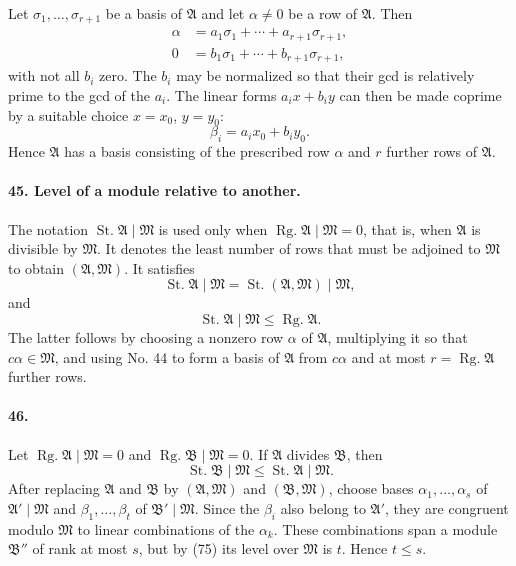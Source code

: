 \documentclass[11pt]{article}
\newcommand{\Rg}{\operatorname{Rg.}}
\newcommand{\St}{\operatorname{St.}}
\begin{document}
Let $\sigma_1,
\ldots,
\sigma_{r+1}$ be a basis of $\mathfrak A$ and let $\alpha\ne0$ be a row of $\mathfrak A$. Then
\begin{align}
\alpha&=a_1\sigma_1+
\cdots+a_{r+1}\sigma_{r+1},
\tag{71}\\
0&=b_1\sigma_1+
\cdots+b_{r+1}\sigma_{r+1},
\tag{72}
\end{align}
with not all $b_i$ zero. The $b_i$ may be normalized so that their gcd is relatively prime to the gcd of the $a_i$. The linear forms $a_ix+b_iy$ can then be made coprime by a suitable choice $x=x_0$, $y=y_0$:
\begin{equation}
\beta_i=a_ix_0+b_iy_0.
\tag{73}
\end{equation}
Hence $\mathfrak A$ has a basis consisting of the prescribed row $\alpha$ and $r$ further rows of $\mathfrak A$.

\paragraph{45. Level of a module relative to another.}
The notation $\St\mathfrak A\mid\mathfrak M$ is used only when $\Rg\mathfrak A\mid\mathfrak M=0$, that is, when $\mathfrak A$ is divisible by $\mathfrak M$. It denotes the least number of rows that must be adjoined to $\mathfrak M$ to obtain $(\mathfrak A,
\mathfrak M)$. It satisfies
\begin{equation}
\St\mathfrak A\mid\mathfrak M=\St(\mathfrak A,
\mathfrak M)\mid\mathfrak M,
\tag{74}
\end{equation}
and
\begin{equation}
\St\mathfrak A\mid\mathfrak M\le \Rg\mathfrak A.
\tag{75}
\end{equation}
The latter follows by choosing a nonzero row $\alpha$ of $\mathfrak A$, multiplying it so that $c\alpha\in\mathfrak M$, and using No. 44 to form a basis of $\mathfrak A$ from $c\alpha$ and at most $r=\Rg\mathfrak A$ further rows.

\paragraph{46.}
Let $\Rg\mathfrak A\mid\mathfrak M=0$ and $\Rg\mathfrak B\mid\mathfrak M=0$. If $\mathfrak A$ divides $\mathfrak B$, then
\begin{equation}
\St\mathfrak B\mid\mathfrak M\le \St\mathfrak A\mid\mathfrak M.
\tag{76}
\end{equation}
After replacing $\mathfrak A$ and $\mathfrak B$ by $(\mathfrak A,
\mathfrak M)$ and $(\mathfrak B,
\mathfrak M)$, choose bases $\alpha_1,
\ldots,
\alpha_s$ of $\mathfrak A'\mid\mathfrak M$ and $\beta_1,
\ldots,
\beta_t$ of $\mathfrak B'\mid\mathfrak M$. Since the $\beta_i$ also belong to $\mathfrak A'$, they are congruent modulo $\mathfrak M$ to linear combinations of the $\alpha_k$. These combinations span a module $\mathfrak B''$ of rank at most $s$, but by (75) its level over $\mathfrak M$ is $t$. Hence $t\le s$.
\end{document}
